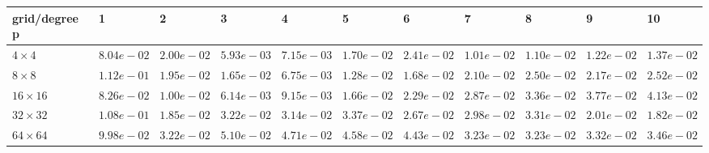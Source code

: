 \begin{tabular}{lllllllllll}
\hline
 grid/degree p   & 1          & 2          & 3          & 4          & 5          & 6          & 7          & 8          & 9          & 10         \\
\hline
 $4 \times 4$    & $8.04e-02$ & $2.00e-02$ & $5.93e-03$ & $7.15e-03$ & $1.70e-02$ & $2.41e-02$ & $1.01e-02$ & $1.10e-02$ & $1.22e-02$ & $1.37e-02$ \\
 $8 \times 8$    & $1.12e-01$ & $1.95e-02$ & $1.65e-02$ & $6.75e-03$ & $1.28e-02$ & $1.68e-02$ & $2.10e-02$ & $2.50e-02$ & $2.17e-02$ & $2.52e-02$ \\
 $16 \times 16$  & $8.26e-02$ & $1.00e-02$ & $6.14e-03$ & $9.15e-03$ & $1.66e-02$ & $2.29e-02$ & $2.87e-02$ & $3.36e-02$ & $3.77e-02$ & $4.13e-02$ \\
 $32 \times 32$  & $1.08e-01$ & $1.85e-02$ & $3.22e-02$ & $3.14e-02$ & $3.37e-02$ & $2.67e-02$ & $2.98e-02$ & $3.31e-02$ & $2.01e-02$ & $1.82e-02$ \\
 $64 \times 64$  & $9.98e-02$ & $3.22e-02$ & $5.10e-02$ & $4.71e-02$ & $4.58e-02$ & $4.43e-02$ & $3.23e-02$ & $3.23e-02$ & $3.32e-02$ & $3.46e-02$ \\
\hline
\end{tabular}